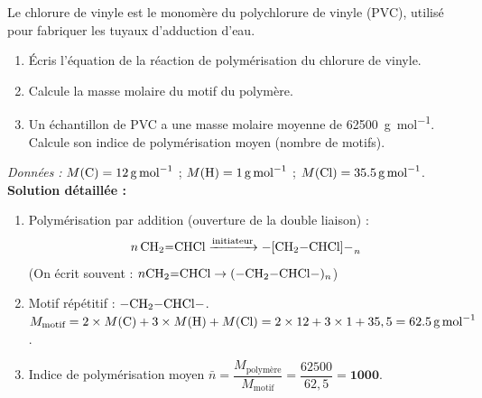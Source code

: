 \documentclass[11pt]{article}
\begin{document}
\begin{exoresolu}
Le chlorure de vinyle  est le monomère du polychlorure de vinyle (PVC), utilisé pour fabriquer les tuyaux d'adduction d'eau.
\begin{enumerate}
\item Écris l'équation de la réaction de polymérisation du chlorure de vinyle.
\item Calcule la masse molaire du motif du polymère.
\item Un échantillon de PVC a une masse molaire moyenne de \SI{62500}{g.mol^{-1}}. Calcule son indice de polymérisation moyen (nombre de motifs).
\end{enumerate}
\emph{Données :} $M(\ce{C}) = \SI{12}{g.mol^{-1}}$ ; $M(\ce{H}) = \SI{1}{g.mol^{-1}}$ ; $M(\ce{Cl}) = \SI{35,5}{g.mol^{-1}}$.
\tcblower
\textbf{Solution détaillée :}
\begin{enumerate}
\item Polymérisation par addition (ouverture de la double liaison) :
  \[ n\,\ce{CH2=CHCl} \xrightarrow{\text{initiateur}} \ce{-[CH2-CHCl]-_n} \]
  (On écrit souvent : $n \ce{CH2=CHCl} \rightarrow \ce{(-CH2-CHCl-)_n}$)
\item Motif répétitif : $\ce{-CH2-CHCl-}$.
  $M_{\text{motif}} = 2 \times M(\ce{C}) + 3 \times M(\ce{H}) + M(\ce{Cl}) = 2\times12 + 3\times1 + 35,5 = \SI{62,5}{g.mol^{-1}}$.
\item Indice de polymérisation moyen $\bar{n} = \dfrac{M_{\text{polymère}}}{M_{\text{motif}}} = \dfrac{62500}{62,5} = \textbf{1000}$.
\end{enumerate}
\end{exoresolu}
\end{document}
